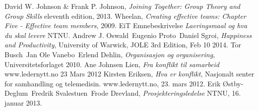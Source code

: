 \begin{thebibliography}{99}	%
		David W. Johnson \& Frank P. Johnson,
		\emph{Joining Together: Group Theory and Group Skills}
		eleventh edition,
		2013.
		Wheelan,
		\emph{Creating effective teams: Chapter Five - Effective team members},
		2009.
		EiT Emnebeskrivelse
		\emph{Laeringsmaal og hva du skal levere}
		NTNU.
		Andrew J. Oswald\, Eugenio Proto\, Daniel Sgroi,
		\emph{Happiness and Productivity},
		University of Warwick,
		JOLE 3rd Edition, Feb 10 2014.
		Tor Busch\, Jan Ole Vanebo\, Erlend Dehlin,
		\emph{Organisasjon og organisering},
		Universitetsforlaget 2010.
		Ane Johnsen Lien,
		\emph{Fra konflikt til samarbeid}
		www.ledernytt.no
		23 Mars 2012
		Kirsten Eriksen,
		\emph{Hva er konflikt},
		Nasjonalt senter for samhandling og telemedisin. 
		www.ledernytt.no,
		23. mars 2012.
		Erik Østby-Deglum\, Fredrik Svalestuen\, Frode Drevland,
		\emph{Prosjekteringsledelse}
		NTNU,
		16. januar 2013.

\end{thebibliography}